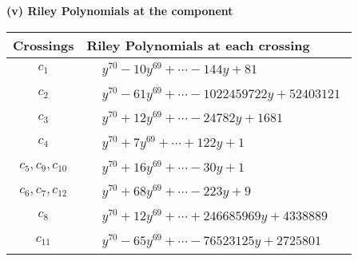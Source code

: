 \documentclass[1p]{elsarticle_modified}
\theoremstyle{definition}
\begin{document}
\newpage\renewcommand{\arraystretch}{1}
\flushleft \textbf{(v) Riley Polynomials at the component}\newline \\
\begin{tabular}{m{50pt}|m{274pt}}
Crossings & \hspace{64pt}Riley Polynomials at each crossing \\
\hline $$\begin{aligned}c_{1}\end{aligned}$$&$\begin{aligned}
&y^{70}-10 y^{69}+\cdots-144 y+81
\end{aligned}$\\
\hline $$\begin{aligned}c_{2}\end{aligned}$$&$\begin{aligned}
&y^{70}-61 y^{69}+\cdots-1022459722 y+52403121
\end{aligned}$\\
\hline $$\begin{aligned}c_{3}\end{aligned}$$&$\begin{aligned}
&y^{70}+12 y^{69}+\cdots-24782 y+1681
\end{aligned}$\\
\hline $$\begin{aligned}c_{4}\end{aligned}$$&$\begin{aligned}
&y^{70}+7 y^{69}+\cdots+122 y+1
\end{aligned}$\\
\hline $$\begin{aligned}c_{5},c_{9},c_{10}\end{aligned}$$&$\begin{aligned}
&y^{70}+16 y^{69}+\cdots-30 y+1
\end{aligned}$\\
\hline $$\begin{aligned}c_{6},c_{7},c_{12}\end{aligned}$$&$\begin{aligned}
&y^{70}+68 y^{69}+\cdots-223 y+9
\end{aligned}$\\
\hline $$\begin{aligned}c_{8}\end{aligned}$$&$\begin{aligned}
&y^{70}+12 y^{69}+\cdots+246685969 y+4338889
\end{aligned}$\\
\hline $$\begin{aligned}c_{11}\end{aligned}$$&$\begin{aligned}
&y^{70}-65 y^{69}+\cdots-76523125 y+2725801
\end{aligned}$\\
\hline
\end{tabular}\\~\\
\end{document}
